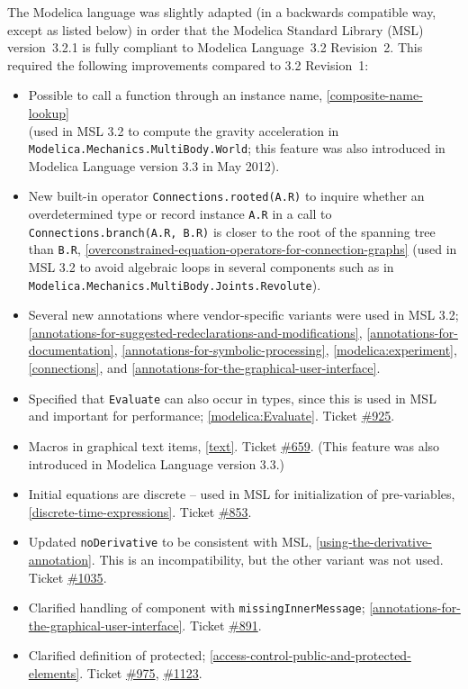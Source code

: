 The Modelica language was slightly adapted (in a backwards compatible way, except as listed below) in order that the Modelica Standard Library (MSL) version~3.2.1 is fully compliant to Modelica
Language~3.2 Revision~2.  This required the following improvements compared to 3.2 Revision~1:
\begin{itemize}
\item
  Possible to call a function through an instance name, \cref{composite-name-lookup}\\
  (used in MSL 3.2 to compute the gravity acceleration in \lstinline!Modelica.Mechanics.MultiBody.World!; this feature was also introduced in Modelica Language version 3.3 in May 2012).
\item
  New built-in operator \lstinline!Connections.rooted(A.R)! to inquire whether an overdetermined type or record instance \lstinline!A.R! in a call to \lstinline!Connections.branch(A.R, B.R)! is closer to the root of the spanning tree than \lstinline!B.R!, \cref{overconstrained-equation-operators-for-connection-graphs} (used in MSL 3.2 to avoid algebraic loops in several components such as in \lstinline!Modelica.Mechanics.MultiBody.Joints.Revolute!).
\item
  Several new annotations where vendor-specific variants were used in MSL 3.2; \cref{annotations-for-suggested-redeclarations-and-modifications}, \cref{annotations-for-documentation}, \cref{annotations-for-symbolic-processing}, \cref{modelica:experiment}, \cref{connections}, and \cref{annotations-for-the-graphical-user-interface}.
\item
  Specified that \lstinline!Evaluate! can also occur in types, since this is used in MSL and important for performance; \cref{modelica:Evaluate}.
  Ticket \href{https://github.com/modelica/ModelicaSpecification/issues/925}{\#925}.
\item
  Macros in graphical text items, \cref{text}. Ticket
  \href{https://github.com/modelica/ModelicaSpecification/issues/659}{\#659}. (This
  feature was also introduced in Modelica Language version 3.3.)
\item
  Initial equations are discrete -- used in MSL for initialization of pre-variables, \cref{discrete-time-expressions}.
  Ticket \href{https://github.com/modelica/ModelicaSpecification/issues/853}{\#853}.
\item
  Updated \lstinline!noDerivative! to be consistent with MSL, \cref{using-the-derivative-annotation}.  This is an incompatibility, but the other variant was not used.
  Ticket \href{https://github.com/modelica/ModelicaSpecification/issues/1035}{\#1035}.
\item
  Clarified handling of component with \lstinline!missingInnerMessage!; \cref{annotations-for-the-graphical-user-interface}.
  Ticket \href{https://github.com/modelica/ModelicaSpecification/issues/891}{\#891}.
\item
  Clarified definition of protected; \cref{access-control-public-and-protected-elements}. Ticket
  \href{https://github.com/modelica/ModelicaSpecification/issues/975}{\#975},
  \href{https://github.com/modelica/ModelicaSpecification/issues/1123}{\#1123}.
\end{itemize}

